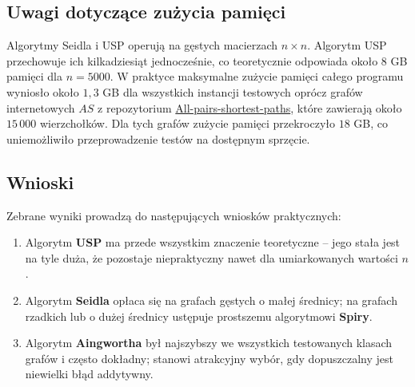 \subsection{Uwagi dotyczące zużycia pamięci}

Algorytmy Seidla i USP operują na gęstych macierzach $n \times n$. Algorytm USP
przechowuje ich kilkadziesiąt jednocześnie, co teoretycznie odpowiada około $8$ GB
pamięci dla $n=5000$. W praktyce maksymalne zużycie pamięci całego programu wyniosło około $1{,}3$ GB dla wszystkich instancji testowych
oprócz grafów internetowych $AS$ z repozytorium \href{https://github.com/Antoine-H/All-pairs-shortest-paths}{All-pairs-shortest-paths},
które zawierają około $15\,000$ wierzchołków. Dla tych grafów zużycie
pamięci przekroczyło $18$ GB, co uniemożliwiło przeprowadzenie testów
na dostępnym sprzęcie.

\subsection{Wnioski}

Zebrane wyniki prowadzą do następujących wniosków praktycznych:
\begin{enumerate}
    \item Algorytm \textbf{USP} ma przede wszystkim znaczenie teoretyczne -- jego
        stała jest na tyle duża, że pozostaje niepraktyczny nawet dla umiarkowanych
        wartości $n$. 
    \item Algorytm \textbf{Seidla} opłaca się na grafach gęstych o małej średnicy;
        na grafach rzadkich lub o dużej średnicy ustępuje prostszemu algorytmowi
        \textbf{Spiry}.
    \item Algorytm \textbf{Aingwortha} był najszybszy we wszystkich testowanych
        klasach grafów i często dokładny; stanowi atrakcyjny wybór, gdy dopuszczalny
        jest niewielki błąd addytywny.
\end{enumerate}


\newpage